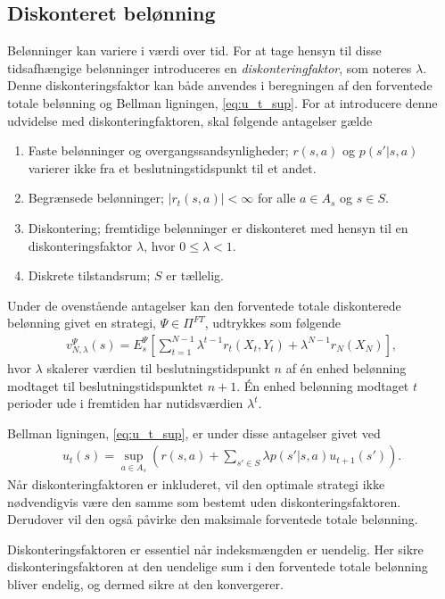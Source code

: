 \subsection{Diskonteret belønning}
Belønninger kan variere i værdi over tid. For at tage hensyn til disse tidsafhængige belønninger introduceres en \textit{diskonteringfaktor}, som noteres $\lambda$. Denne diskonteringsfaktor kan både anvendes i beregningen af den forventede totale belønning og Bellman ligningen, \ref{eq:u_t_sup}. For at introducere denne udvidelse med diskonteringfaktoren, skal følgende antagelser gælde

\begin{enumerate}
    \item Faste belønninger og overgangssandsynligheder; $r(s,a)$ og $p(s'|s,a)$ varierer ikke fra et beslutningstidspunkt til et andet.
    \item Begrænsede belønninger; $|r_t(s,a)| < \infty$ for alle $a\in A_s$ og $s\in S$.
    \item Diskontering; fremtidige belønninger er diskonteret med hensyn til en diskonteringsfaktor $\lambda$, hvor $0 \leq \lambda < 1$.
    \item Diskrete tilstandsrum; $S$ er tællelig.
\end{enumerate}

Under de ovenstående antagelser kan den forventede totale diskonterede belønning givet en strategi, $\Psi\in \Pi^{FT}$, udtrykkes som følgende 
\begin{align*}
    v_{N,\lambda}^\Psi(s)=E_s^\Psi\left[\sum_{t=1}^{N-1}\lambda^{t-1}r_t(X_t, Y_t)+\lambda^{N-1}r_N(X_N)\right],
\end{align*}
hvor $\lambda$ skalerer værdien til beslutningstidspunkt $n$ af én enhed belønning modtaget til beslutningstidspunktet $n+1$. Én enhed belønning modtaget $t$ perioder ude i fremtiden har nutidsværdien $\lambda^t$.

Bellman ligningen, \eqref{eq:u_t_sup}, er under disse antagelser givet ved
\begin{align*}
    u_t(s) = \sup_{a \in A_s} \left( r(s,a) + \sum_{s'\in S} \lambda p\left(s'|s,a\right)u_{t+1}(s')\right).
\end{align*}
Når diskonteringfaktoren er inkluderet, vil den optimale strategi ikke nødvendigvis være den samme som bestemt uden diskonteringsfaktoren. Derudover vil den også påvirke den maksimale forventede totale belønning. 

Diskonteringsfaktoren er essentiel når indeksmængden er uendelig. Her sikre diskonteringsfaktoren at den uendelige sum i den forventede totale belønning bliver endelig, og dermed sikre at den konvergerer. 












